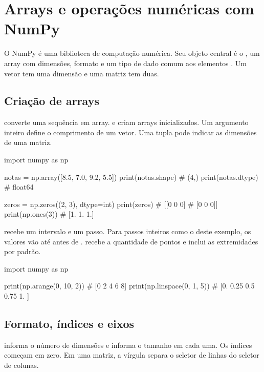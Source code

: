 \section{Arrays e operações numéricas com NumPy}
\label{sec:numpy}

O NumPy é uma biblioteca de computação numérica. Seu objeto central é o , um array com dimensões, formato e um tipo de dado comum aos elementos \cite{numpy}. Um vetor tem uma dimensão e uma matriz tem duas.

\subsection{Criação de arrays}

 converte uma sequência em array.  e  criam arrays inicializados. Um argumento inteiro define o comprimento de um vetor. Uma tupla pode indicar as dimensões de uma matriz.

\begin{exemplo}
import numpy as np

notas = np.array([8.5, 7.0, 9.2, 5.5])
print(notas.shape)  # (4,)
print(notas.dtype)  # float64

zeros = np.zeros((2, 3), dtype=int)
print(zeros)
# [[0 0 0]
#  [0 0 0]]
print(np.ones(3))  # [1. 1. 1.]
\end{exemplo}

 recebe um intervalo e um passo. Para passos inteiros como o deste exemplo, os valores vão até antes de .  recebe a quantidade de pontos e inclui as extremidades por padrão.

\begin{exemplo}
import numpy as np

print(np.arange(0, 10, 2))     # [0 2 4 6 8]
print(np.linspace(0, 1, 5))   # [0.   0.25 0.5  0.75 1.  ]
\end{exemplo}

\subsection{Formato, índices e eixos}

 informa o número de dimensões e  informa o tamanho em cada uma. Os índices começam em zero. Em uma matriz, a vírgula separa o seletor de linhas do seletor de colunas.

